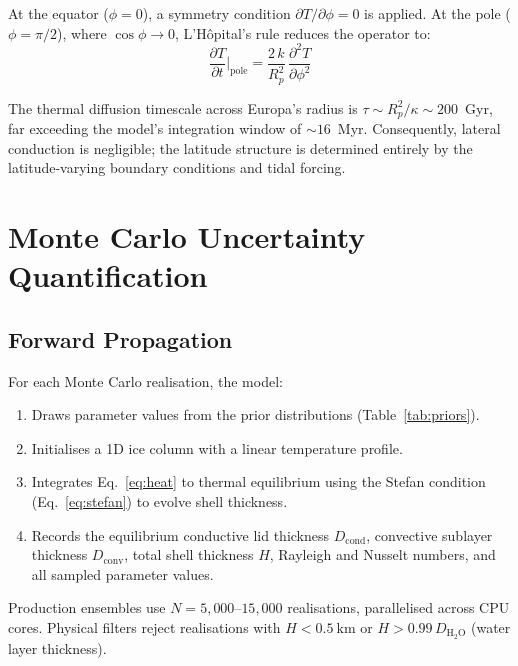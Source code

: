 \documentclass[11pt,a4paper]{article}
\newcommand{\pp}{\partial}
\begin{document}
At the equator ($\phi = 0$), a symmetry condition
$\pp T/\pp\phi = 0$ is applied. At the pole ($\phi = \pi/2$), where
$\cos\phi \to 0$, L'H\^{o}pital's rule reduces the operator to:
\begin{equation}
\frac{\pp T}{\pp t}\bigg|_{\mathrm{pole}}
  = \frac{2\,k}{R_p^2}\,\frac{\pp^2 T}{\pp\phi^2}
\end{equation}

The thermal diffusion timescale across Europa's radius is
$\tau \sim R_p^2/\kappa \sim 200$~Gyr, far exceeding the
model's integration window of ${\sim}16$~Myr. Consequently,
lateral conduction is negligible; the latitude structure is determined
entirely by the latitude-varying boundary conditions and tidal forcing.

\section{Monte Carlo Uncertainty Quantification}
\label{sec:mc}

\subsection{Forward Propagation}

For each Monte Carlo realisation, the model:
\begin{enumerate}[leftmargin=2em]
\item Draws parameter values from the prior distributions
      (Table~\ref{tab:priors}).
\item Initialises a 1D ice column with a linear temperature profile.
\item Integrates Eq.~\ref{eq:heat} to thermal equilibrium using the
      Stefan condition (Eq.~\ref{eq:stefan}) to evolve shell thickness.
\item Records the equilibrium conductive lid thickness $D_{\mathrm{cond}}$,
      convective sublayer thickness $D_{\mathrm{conv}}$, total shell
      thickness $H$, Rayleigh and Nusselt numbers, and all sampled
      parameter values.
\end{enumerate}

Production ensembles use $N = 5{,}000$--$15{,}000$ realisations,
parallelised across CPU cores. Physical filters reject realisations with
$H < \SI{0.5}{\kilo\metre}$ or $H > 0.99\,D_{\mathrm{H_2O}}$ (water
layer thickness).
\end{document}
